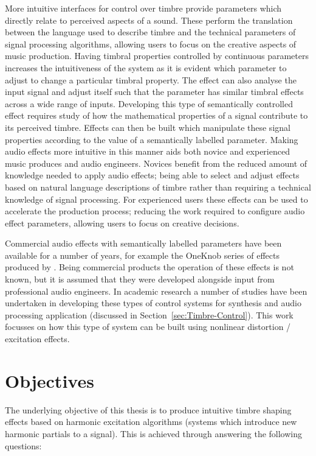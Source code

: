 	More intuitive interfaces for control over timbre provide parameters which directly relate to perceived aspects of a
	sound. These perform the translation between the language used to describe timbre and the technical parameters of
	signal processing algorithms, allowing users to focus on the creative aspects of music production. Having timbral
	properties controlled by continuous parameters increases the intuitiveness of the system as it is evident which
	parameter to adjust to change a particular timbral property. The effect can also analyse the input signal and adjust
	itself such that the parameter has similar timbral effects across a wide range of inputs. Developing this type of
	semantically controlled effect requires study of how the mathematical properties of a signal contribute to its
	perceived timbre. Effects can then be built which manipulate these signal properties according to the value of a
	semantically labelled parameter. Making audio effects more intuitive in this manner aids both novice and experienced
	music produces and audio engineers. Novices benefit from the reduced amount of knowledge needed to apply audio
	effects; being able to select and adjust effects based on natural language descriptions of timbre rather than
	requiring a technical knowledge of signal processing. For experienced users these effects can be used to accelerate
	the production process; reducing the work required to configure audio effect parameters, allowing users to focus on
	creative decisions. 
	
	Commercial audio effects with semantically labelled parameters have been available for a number of years, for
	example the OneKnob series of effects produced by \citet{wavesoneknob}. Being commercial products the operation of
	these effects is not known, but it is assumed that they were developed alongside input from professional audio
	engineers. In academic research a number of studies have been undertaken in developing these types of control
	systems for synthesis and audio processing application (discussed in Section~\ref{sec:Timbre-Control}). This work
	focusses on how this type of system can be built using nonlinear distortion / excitation effects.

\section{Objectives}
\label{sec:Introduction-Objectives}
	The underlying objective of this thesis is to produce intuitive timbre shaping effects based on harmonic excitation
	algorithms (systems which introduce new harmonic partials to a signal). This is achieved through answering the
	following questions:

